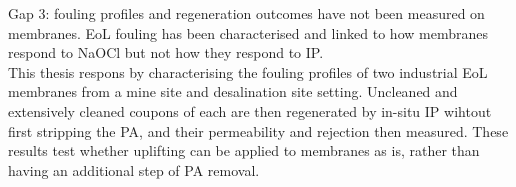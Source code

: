 Gap 3: fouling profiles and regeneration outcomes have not been measured on membranes. EoL fouling has been characterised and linked to how membranes respond to NaOCl \citep{Molinaa2018} but not how they respond to IP.\\

This thesis respons by characterising the fouling profiles of two industrial EoL membranes from a mine site and desalination site setting. Uncleaned and extensively cleaned coupons of each are then regenerated by in-situ IP wihtout first stripping the PA, and their permeability and rejection then measured. These results test whether uplifting can be applied to membranes as is, rather than having an additional step of PA removal. 
